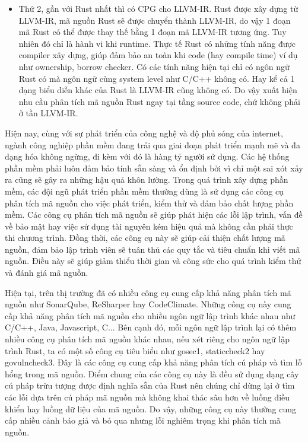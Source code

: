 \begin{itemize}
    \item Thứ 2, gần với Rust nhất thì có CPG cho LLVM-IR. Rust được xây dựng từ LLVM-IR, mã nguồn Rust sẽ được chuyển thành LLVM-IR, do vậy 1 đoạn mã Rust có thể được thay thế bằng 1 đoạn mã LLVM-IR tương ứng. Tuy nhiên đó chỉ là hành vi khi runtime. Thực tế Rust có những tính năng được compiler xây dựng, giúp đảm bảo an toàn khi code (hay compile time) ví dụ như ownership, borrow checker. Có các tính năng hiện tại chỉ có ngôn ngữ Rust có mà ngôn ngữ cùng system level như C/C++ không có. Hay kể cả 1 dạng biểu diễn khác của Rust là LLVM-IR cũng không có. Do vậy xuất hiện nhu cầu phân tích mã nguồn Rust ngay tại tầng source code, chứ không phải ở tần LLVM-IR.
\end{itemize}

Hiện nay, cùng với sự phát triển của công nghệ và độ phủ sóng của internet, ngành công nghiệp phần mềm đang trải qua giai đoạn phát triển mạnh mẽ và đa dạng hóa không ngừng, đi kèm với đó là hàng tỷ người sử dụng.
Các hệ thống phần mềm phải luôn đảm bảo tính sẵn sàng và ổn định bởi vì chỉ một sai xót xảy ra cũng sẽ gây ra những hậu quả khôn lường.
Trong quá trình xây dựng phần mềm, các đội ngũ phát triển phần mềm thường dùng là sử dụng các công cụ phân tích mã nguồn cho việc phát triển, kiểm thử và đảm bảo chất lượng phần mềm.
Các công cụ phân tích mã nguồn sẽ giúp phát hiện các lỗi lập trình, vấn đề về bảo mật hay việc sử dụng tài nguyên kém hiệu quả mà không cần phải thực thi chương trình.
Đồng thời, các công cụ này sẽ giúp cải thiện chất lượng mã nguồn, đảm bảo lập trình viên sẽ tuân thủ các quy tắc và tiêu chuẩn khi viết mã nguồn.
Điều này sẽ giúp giảm thiểu thời gian và công sức cho quá trình kiểm thử và đánh giá mã nguồn.

Hiện tại, trên thị trường đã có nhiều công cụ cung cấp khả năng phân tích mã nguồn như SonarQube, ReSharper hay CodeClimate.
Những công cụ này cung cấp khả năng phân tích mã nguồn cho nhiều ngôn ngữ lập trình khác nhau như C/C++, Java, Javascript, C...
Bên cạnh đó, mỗi ngôn ngữ lập trình lại có thêm nhiều công cụ phân tích mã nguồn khác nhau, nếu xét riêng cho ngôn ngữ lập trình Rust, ta có một số công cụ tiêu biểu như gosec1, staticcheck2 hay govulncheck3.
Đây là các công cụ cung cấp khả năng phân tích cú pháp và tìm lỗ hổng trong mã nguồn.
Điểm chung của các công cụ này là đều sử dụng dạng cây cú pháp trừu tượng được định nghĩa sẵn của Rust nên chúng chỉ dừng lại ở tìm các lỗi dựa trên cú pháp mã nguồn mà không khai thác sâu hơn về luồng điều khiển hay luồng dữ liệu của mã nguồn.
Do vậy, những công cụ này thường cung cấp nhiều cảnh báo giả và bỏ qua nhưng lỗi nghiêm trọng khi phân tích mã nguồn.

